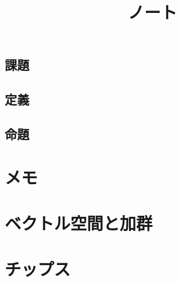 \documentclass[6pt]{jreport}
\title{ノート}
\author{}
\begin{document}
\maketitle
\tableofcontents
\section*{課題}
\section*{定義}
\section*{命題}

\chapter{メモ}


%
%
%
%
%
%
%
%
%
%
%
%
%
%
%
%
%
%
%
\chapter{ベクトル空間と加群}
%

%
%
%
%
%
\chapter{チップス}
%

%



\end{document}
